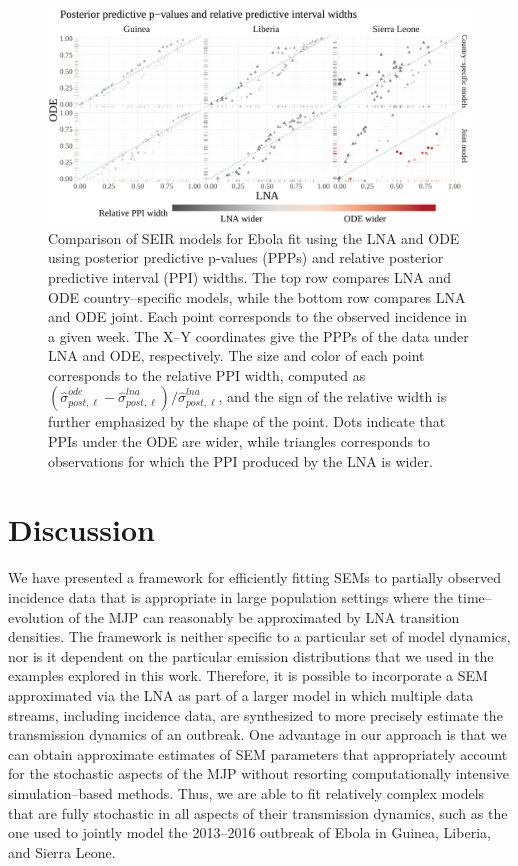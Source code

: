 \begin{figure}[htbp]
	\centering
	\includegraphics[width=0.85\linewidth]{figures/ebola_lna_ode_ppicomp}
	\caption[Comparison of SEIR Ebola models fit via the LNA and ODE with posterior predictive p-values and relative predictive interval widths.]{Comparison of SEIR models for Ebola fit using the LNA and ODE using posterior predictive p-values (PPPs) and relative posterior predictive interval (PPI) widths. The top row compares LNA and ODE country--specific models, while the bottom row compares LNA and ODE joint. Each point corresponds to the observed incidence in a given week. The X--Y coordinates give the PPPs of the data under LNA and ODE, respectively. The size and color of each point corresponds to the relative PPI width, computed as $ (\widehat{\sigma}_{post,\ell}^{ode} - \widehat{\sigma}_{post,\ell}^{lna})/\widehat{\sigma}_{post,\ell}^{lna}$, and the sign of the relative width is further emphasized by the shape of the point. Dots indicate that PPIs under the ODE are wider, while triangles corresponds to observations for which the PPI produced by the LNA is wider.}
	\label{fig:ebola_lna_ode_ppicomp}
\end{figure}

\newpage
\section{Discussion}
\label{sec:lna_discussion}

We have presented a framework for efficiently fitting SEMs to partially observed incidence data that is appropriate in large population settings where the time--evolution of the MJP can reasonably be approximated by LNA transition densities. The framework is neither specific to a particular set of model dynamics, nor is it dependent on the particular emission distributions that we used in the examples explored in this work. Therefore, it is possible to incorporate a SEM approximated via the LNA as part of a larger model in which multiple data streams, including incidence data, are synthesized to more precisely estimate the transmission dynamics of an outbreak. One advantage in our approach is that we can obtain approximate estimates of SEM parameters that appropriately account for the stochastic aspects of the MJP without resorting computationally intensive simulation--based methods. Thus, we are able to fit relatively complex models that are fully stochastic in all aspects of their transmission dynamics, such as the one used to jointly model the 2013--2016 outbreak of Ebola in Guinea, Liberia, and Sierra Leone. 

